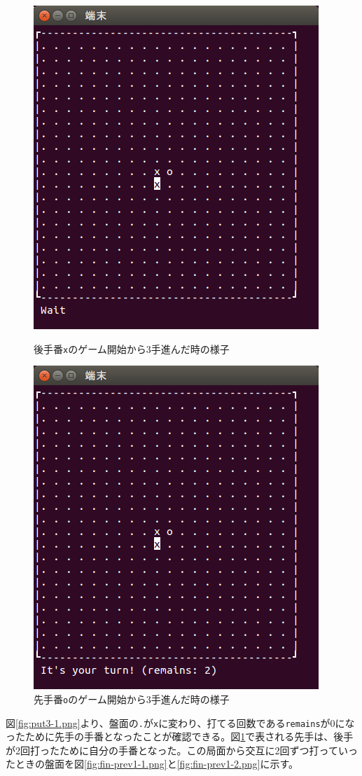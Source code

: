 \documentclass[a4j, titlepage, 10pt]{jsarticle}
\newcommand{\code}[1]{\texttt{#1}}
\begin{document}
\begin{figure}[H]
  \begin{minipage}{0.5\hsize}
    \centering
    \includegraphics[scale=0.5]{img/put3-1.png}
    \caption{後手番\code{x}のゲーム開始から3手進んだ時の様子}
    \label{fig:put3-1.png}
  \end{minipage}
  \begin{minipage}{0.5\hsize}
    \includegraphics[scale=0.5]{img/put3-2.png}
    \caption{先手番\code{o}のゲーム開始から3手進んだ時の様子}
    \label{fig:put3-2.png}
  \end{minipage}
\end{figure}
図\ref{fig:put3-1.png}より、盤面の\texttt{.}が\texttt{x}に変わり、打てる回数である\texttt{remains}が0になったために先手の手番となったことが確認できる。図\ref{fig:put3-2.png}で表される先手は、後手が2回打ったために自分の手番となった。この局面から交互に2回ずつ打っていったときの盤面を図\ref{fig:fin-prev1-1.png}と\ref{fig:fin-prev1-2.png}に示す。
\end{document}
